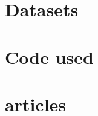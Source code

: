 \documentclass[11pt,a4paper,UKenglish]{report}
\begin{document}
\section{Datasets}
\section{Code used}
\section{articles}












\end{document}
